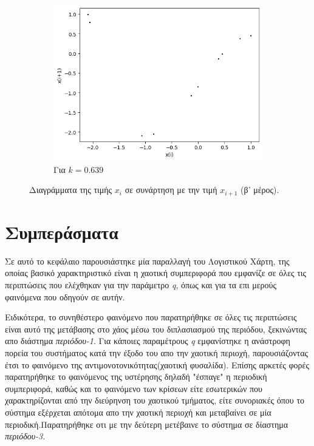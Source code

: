 \begin{figure}[ht]
\begin{subfigure}[b]{0.4\textwidth}
		\includegraphics[width=\textwidth]{LateX images/graphs q21/g13}
		\caption{Για $k=0.639$}
		\label{f:k113}
	\end{subfigure}
	\hfill
	\caption{Διαγράμματα της τιμής \(x_i\) σε συνάρτηση με την τιμή \(x_{i+1}\) (β' μέρος).}
	\label{f:k245}
\end{figure}

\clearpage


\section{Συμπεράσματα}

Σε αυτό το κεφάλαιο παρουσιάστηκε μία παραλλαγή του Λογιστικού Χάρτη, της οποίας βασικό χαρακτηριστικό είναι η χαοτική συμπεριφορά που εμφανίζε σε όλες τις περιπτώσεις που ελέχθηκαν για την παράμετρο \emph{q}, όπως και για τα επι μερούς φαινόμενα που οδηγούν σε αυτήν.

Ειδικότερα, το συνηθέστερο φαινόμενο που παρατηρήθηκε σε όλες τις περιπτώσεις είναι αυτό της μετάβασης στο χάος μέσω του διπλασιασμού της περιόδου, ξεκινώντας απο διάστημα \emph{περιόδου-1}.
Για κάποιες παραμέτρους  \emph{q} εμφανίστηκε η ανάστροφη πορεία του συστήματος κατά την έξοδο του απο την χαοτική περιοχή, παρουσιάζοντας έτσι το φαινόμενο της αντιμονοτονικότητας(χαοτική φυσαλίδα).
Επίσης αρκετές φορές παρατηρήθηκε το φαινόμενος της υστέρησης δηλαδή "έσπαγε" η περιοδική συμπεριφορά, καθώς και το φαινόμενο των κρίσεων είτε εσωτερικών που χαρακτηρίζονται από την διεύρηνση του χαοτικού τμήματος, είτε συνοριακές όπου το σύστημα εξέρχεται απότομα απο την χαοτική περιοχή και μεταβαίνει σε μία περιοδική.Παρατηρήθηκε οτι με  την δεύτερη μετέβαινε το σύστημα σε δίαστημα \emph{περιόδου-3}.
